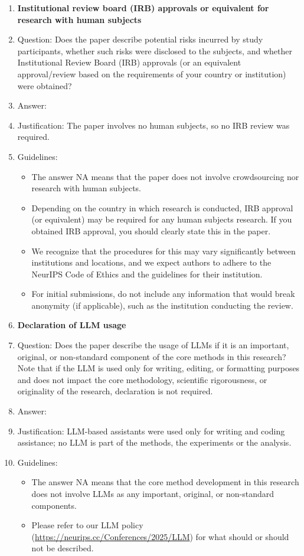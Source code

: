 \documentclass{article}
\begin{document}
\begin{enumerate}
\item {\bf Institutional review board (IRB) approvals or equivalent for research with human subjects}
    \item[] Question: Does the paper describe potential risks incurred by study participants, whether such risks were disclosed to the subjects, and whether Institutional Review Board (IRB) approvals (or an equivalent approval/review based on the requirements of your country or institution) were obtained?
    \item[] Answer: \answerNA{}
    \item[] Justification: The paper involves no human subjects, so no IRB review was required.
    \item[] Guidelines:
    \begin{itemize}
        \item The answer NA means that the paper does not involve crowdsourcing nor research with human subjects.
        \item Depending on the country in which research is conducted, IRB approval (or equivalent) may be required for any human subjects research. If you obtained IRB approval, you should clearly state this in the paper.
        \item We recognize that the procedures for this may vary significantly between institutions and locations, and we expect authors to adhere to the NeurIPS Code of Ethics and the guidelines for their institution.
        \item For initial submissions, do not include any information that would break anonymity (if applicable), such as the institution conducting the review.
    \end{itemize}

\item {\bf Declaration of LLM usage}
    \item[] Question: Does the paper describe the usage of LLMs if it is an important, original, or non-standard component of the core methods in this research? Note that if the LLM is used only for writing, editing, or formatting purposes and does not impact the core methodology, scientific rigorousness, or originality of the research, declaration is not required.
    \item[] Answer: \answerNA{}
    \item[] Justification: LLM-based assistants were used only for writing and coding assistance; no LLM is part of the methods, the experiments or the analysis.
    \item[] Guidelines:
    \begin{itemize}
        \item The answer NA means that the core method development in this research does not involve LLMs as any important, original, or non-standard components.
        \item Please refer to our LLM policy (\url{https://neurips.cc/Conferences/2025/LLM}) for what should or should not be described.
    \end{itemize}

\end{enumerate}
\end{document}
